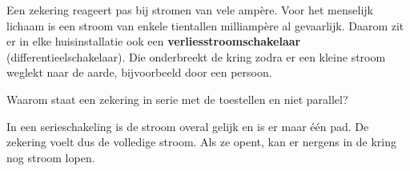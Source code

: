 \documentclass{ximera}
\begin{document}
\begin{remark}[foldable=true,title={Een zekering beschermt de leidingen}]\nl
    Een zekering reageert pas bij stromen van vele ampère. Voor het menselijk lichaam is een stroom van enkele tientallen milliampère al gevaarlijk. Daarom zit er in elke huisinstallatie ook een \textbf{verliesstroomschakelaar} (differentieelschakelaar). Die onderbreekt de kring zodra er een kleine stroom weglekt naar de aarde, bijvoorbeeld door een persoon.
\end{remark}

\begin{question}
    Waarom staat een zekering in serie met de toestellen en niet parallel?
    \begin{multipleChoice}
    \end{multipleChoice}
    \begin{solution}\nl
        In een serieschakeling is de stroom overal gelijk en is er maar één pad. De zekering voelt dus de volledige stroom. Als ze opent, kan er nergens in de kring nog stroom lopen.
    \end{solution}
\end{question}
\end{document}
